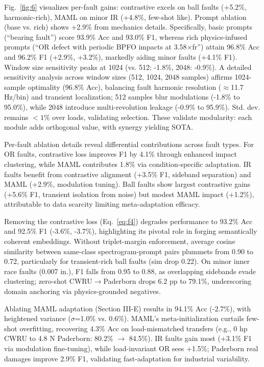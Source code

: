 \begin{table}[htbp]
\begin{table}[htbp]
\begin{table}[htbp]
Fig.~\ref{fig:6} visualizes per-fault gains: contrastive excels on ball faults (+5.2\%, harmonic-rich), MAML on minor IR (+4.8\%, few-shot like). Prompt ablation (base vs. rich) shows +2.9\% from mechanics details. Specifically, basic prompts (``bearing fault'') score 93.9\% Acc and 93.0\% F1, whereas rich physics-infused prompts (``OR defect with periodic BPFO impacts at 3.58$\times$fr'') attain 96.8\% Acc and 96.2\% F1 (+2.9\%, +3.2\%), markedly aiding minor faults (+4.1\% F1). Window size sensitivity peaks at 1024 (vs. 512: -1.8\%, 2048: -0.9\%). A detailed sensitivity analysis across window sizes (512, 1024, 2048 samples) affirms 1024-sample optimality (96.8\% Acc), balancing fault harmonic resolution ($\approx$11.7 Hz/bin) and transient localization; 512 samples blur modulations (-1.8\% to 95.0\%), while 2048 introduce multi-revolution leakage (-0.9\% to 95.9\%). Std. dev. remains $<1\%$ over loads, validating selection. These validate modularity: each module adds orthogonal value, with synergy yielding SOTA.

Per-fault ablation details reveal differential contributions across fault types. For OR faults, contrastive loss improves F1 by 4.1\% through enhanced impact clustering, while MAML contributes 1.8\% via condition-specific adaptation. IR faults benefit from contrastive alignment (+3.5\% F1, sideband separation) and MAML (+2.9\%, modulation tuning). Ball faults show largest contrastive gains (+5.6\% F1, transient isolation from noise) but modest MAML impact (+1.2\%), attributable to data scarcity limiting meta-adaptation efficacy.

Removing the contrastive loss (Eq.~\ref{eq:f4}) degrades performance to 93.2\% Acc and 92.5\% F1 (-3.6\%, -3.7\%), highlighting its pivotal role in forging semantically coherent embeddings. Without triplet-margin enforcement, average cosine similarity between same-class spectrogram-prompt pairs plummets from 0.90 to 0.72, particularly for transient-rich ball faults (sim drop 0.22). On minor inner race faults (0.007 in.), F1 falls from 0.95 to 0.88, as overlapping sidebands evade clustering; zero-shot CWRU$\rightarrow$Paderborn drops 6.2 pp to 79.1\%, underscoring domain anchoring via physics-grounded negatives.

Ablating MAML adaptation (Section III-E) results in 94.1\% Acc (-2.7\%), with heightened variance ($\sigma$=1.0\% vs. 0.6\%). MAML's meta-initialization curtails few-shot overfitting, recovering 4.3\% Acc on load-mismatched transfers (e.g., 0 hp CWRU to 4.8 N Paderborn: 80.2\% $\rightarrow$ 84.5\%). IR faults gain most (+3.1\% F1 via modulation fine-tuning), while load-invariant OR sees +1.5\%; Paderborn real damages improve 2.9\% F1, validating fast-adaptation for industrial variability.


\end{table}
\end{table}
\end{table}
